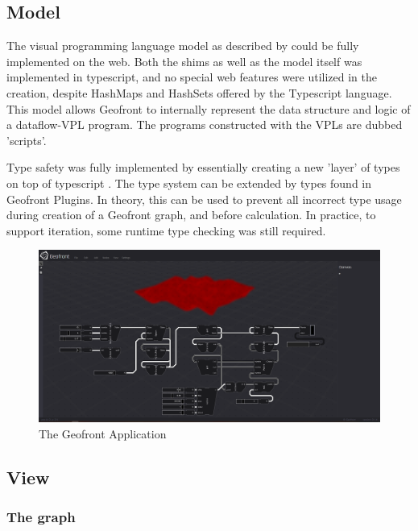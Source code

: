 \subsection{Model}

The visual programming language model as described by  could be fully implemented on the web. 
Both the shims as well as the model itself was implemented in typescript, and no special web features were utilized in the creation, despite HashMaps and HashSets offered by the Typescript language. 
This model allows Geofront to internally represent the data structure and logic of a dataflow-VPL program. 
The programs constructed with the VPLs are dubbed 'scripts'.

Type safety was fully implemented by essentially creating a new 'layer' of types on top of typescript .
The type system can be extended by types found in Geofront Plugins.  
In theory, this can be used to prevent all incorrect type usage during creation of a Geofront graph, and before calculation.
In practice, to support iteration, some runtime type checking was still required. 

\begin{figure}
  \centering
  \graphicspath{ {../../assets/images/implementation/} }
  \includegraphics[width=\linewidth]{full-application.png}
  \caption[Geofront]{The Geofront Application}
  \label{fig:geofront-types}
\end{figure}

\subsection{View}

\subsubsection{The graph}

